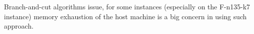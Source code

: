 Branch-and-cut algorithms issue, for some instances (especially on the F-n135-k7 instance)
memory exhaustion of the host machine is a big concern in using such approach.

\begin{comment}
\cite{jepsen2014}
Furthermore, a comparison with state-of-the-art dynamic programming algorithms has
shown that the BAC algorithm is competitive, and acts as a good complement to the dynamic programming algorithms.
That is, in some case the dynamic programming algorithms are much faster and able to solve instances that cannot be
solved by the BAC algorithm. On the other hand the BAC algorithm appear to be superior on very large instances, e.g., the
BAC algorithm solved instances with up to 800 nodes compared to a maximum of 200 nodes for the dynamic programming
algorithms. There is a tendency towards, that the BAC algorithm is faster than the dynamic programming algorithms on
instances with highly negative weights and is slower on instances with solution values close to 0. This is not too surprising
since the bounding functions used in the dynamic programming algorithms is expected to cut off large parts of the state-
space in the latter case. This may render the BAC algorithms less efficient in a column generation scheme for current state-
of-the-art algorithms, since instances with much negativity are usually solved heuristically and only the instances with cost
near zero are solved to optimality. However, our experiments indicate that the BAC algorithm may prove to be worthwhile
when the number of nodes increases (to more than the current maximum of 151 nodes for the CVRP). To sum up, the BAC
algorithm solved 58 out of a total 76 instances which is 18 more than the dynamic programming algorithms, and the BAC
algorithm appears to have its strength when the number of nodes is large.
\end{comment}

\begin{comment}
\cite{jepsen2014}
We believe that there is a large unexploited potential in BAC algorithms for CPTP, and hence the paper is intended to
serve as a platform for further development, also acting as a survey/tutorial. Future research can experiment with subsets
of the presented cuts, extensions of the cuts, and the interplay between these.
\end{comment}

